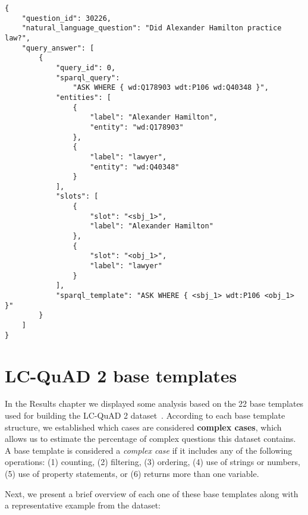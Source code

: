 \newpage

\begin{lstlisting}[captionpos=b, 
    caption=Example of one LC-QuAD 2 case following our proposed normalized format., 
    label=lst:normalizedDatasetExample,
    basicstyle=\ttfamily,frame=single]
{
    "question_id": 30226,
    "natural_language_question": "Did Alexander Hamilton practice law?",
    "query_answer": [
        {
            "query_id": 0,
            "sparql_query": 
                "ASK WHERE { wd:Q178903 wdt:P106 wd:Q40348 }",
            "entities": [
                {
                    "label": "Alexander Hamilton",
                    "entity": "wd:Q178903"
                },
                {
                    "label": "lawyer",
                    "entity": "wd:Q40348"
                }
            ],
            "slots": [
                {
                    "slot": "<sbj_1>",
                    "label": "Alexander Hamilton"
                },
                {
                    "slot": "<obj_1>",
                    "label": "lawyer"
                }
            ],
            "sparql_template": "ASK WHERE { <sbj_1> wdt:P106 <obj_1> }"
        }
    ]
}
\end{lstlisting}

\section{LC-QuAD 2 base templates}
\label{appendix:qaDataset/baseTemplates}
In the Results chapter we displayed some analysis based on the 22 base templates used for building 
the LC-QuAD 2 dataset~\cite{dataset:lcquad2-DubeyBA019}. According to each base template structure, 
we established which cases are considered \textbf{complex cases}, which allows us to estimate the 
percentage of complex questions this dataset contains. A base template is considered a \textit{complex 
case} if it includes any of the following operations: (1) counting, (2) filtering, (3) ordering, 
(4) use of strings or numbers,(5) use of property statements, or (6) returns more than one variable. 

Next, we present a brief overview of each one of these base templates along with a representative 
example from the dataset:

